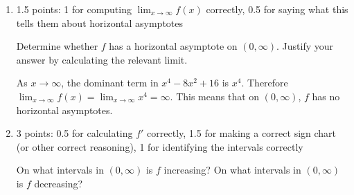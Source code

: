 \documentclass{article}
\begin{document}
\begin{enumerate}[resume]
\begin{enumerate}[resume]
    \begin{problem}[\vfill]
      Find and classify all discontinuities of $f$ on $(0, \infty)$. Justify your classifications using limits.
    \end{problem}

    \begin{solution}
      Since $f$ is given by a single (non-piecewise) formula, its discontinuities are where it's undefined. But we already saw that it's defined everywhere, so it has . 
    \end{solution}

  \item

    \begin{grading}
      1.5 points: 1 for computing $\displaystyle \lim_{x \to \infty} f(x)$ correctly, 0.5 for saying what this tells them about horizontal asymptotes 
    \end{grading}

    \begin{problem}[\vfill]
      Determine whether $f$ has a horizontal asymptote on $(0, \infty)$. Justify your answer by calculating the  relevant limit. 
    \end{problem}

    \begin{solution}
      As $x\to \infty$, the dominant term in $x^4 - 8x^2 + 16$ is $x^4$. 
      Therefore $\displaystyle \lim_{x \to \infty} f(x) = \lim_{x \to \infty} x^4 = \infty$.
      This means that on $(0, \infty)$, $f$ has no horizontal asymptotes.
    \end{solution}

  \item

    \begin{grading}
      3 points: 0.5 for calculating $f'$ correctly, 1.5 for making a correct sign chart (or other correct reasoning), 1 for identifying the intervals correctly 
    \end{grading}

    \begin{problem}[\nstretch{1.5}]
      On what intervals in $(0, \infty)$ is $f$ increasing? On what intervals in $(0, \infty)$ is $f$ decreasing?
    \end{problem}


\end{enumerate}
\end{enumerate}
\end{document}
